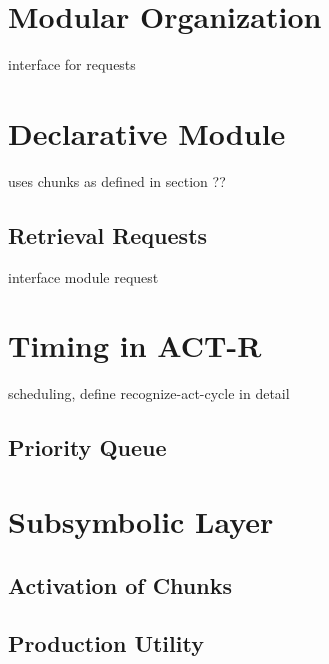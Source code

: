 \section{Modular Organization}

interface for requests

\section{Declarative Module}

uses chunks as defined in section ??

\subsection{Retrieval Requests}

interface module request


\section{Timing in ACT-R}

scheduling, define recognize-act-cycle in detail

\subsection{Priority Queue}


\section{Subsymbolic Layer}

\subsection{Activation of Chunks}

\subsection{Production Utility}

